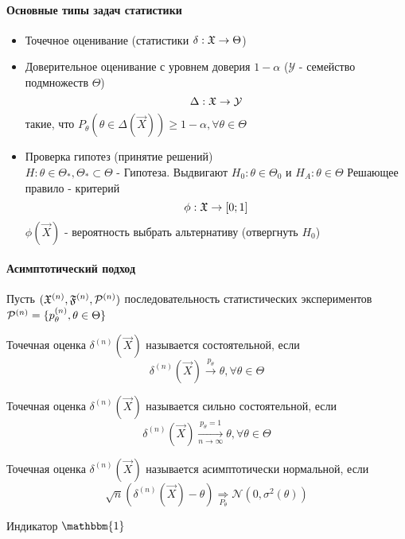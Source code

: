 \documentclass[main.tex]{subfiles}
\begin{document}
\paragraph{Основные типы задач статистики}
\begin{itemize}
	\item Точечное оценивание (статистики $\delta : \mathfrak{X} \rightarrow \Theta$)
	\item Доверительное оценивание с уровнем доверия $1-\alpha$ ($\mathcal{Y}$ - семейство подмножеств $\Theta$)
		$$\Delta : \mathfrak{X} \rightarrow \mathcal{Y}$$
	такие, что $P_\theta (\theta \in \Delta (\vec{X})) \geq 1-\alpha, \forall \theta \in \Theta$
	\item Проверка гипотез (принятие решений) \\
	$H:\theta \in \Theta_*, \Theta_* \subset \Theta$ - Гипотеза. Выдвигают $H_0 : \theta \in \Theta_0$ и $H_A : \theta \in \Theta$ Решающее правило - критерий
	$$\phi : \mathfrak{X} \rightarrow [0;1]$$
	$\phi(\vec{X})$ - вероятность выбрать альтернативу (отвергнуть $H_0$)
\end{itemize}

\paragraph{Асимптотический подход}
Пусть $(\mathfrak{X}^{(n)},\mathfrak{F}^{(n)},\mathcal{P}^{(n)})$ последовательность статистических экспериментов
$\mathcal{P}^{(n)}=\{p_\theta^{(n)},\theta \in \Theta\}$

\begin{definition}
	 Точечная оценка $\delta^{(n)}(\vec{X})$ называется состоятельной, если
	 $$\delta^{(n)}(\vec{X}) \xrightarrow{p_\theta} \theta,\forall \theta \in \Theta $$
\end{definition}

\begin{definition}
	Точечная оценка $\delta^{(n)}(\vec{X})$ называется сильно состоятельной, если
	 $$\delta^{(n)}(\vec{X}) \xrightarrow[n \rightarrow \infty]{p_\theta = 1} \theta,\forall \theta \in \Theta $$
\end{definition}

\begin{definition}
	Точечная оценка $\delta^{(n)}(\vec{X})$ называется асимптотически нормальной, если
	$$\sqrt{n} (\delta^{(n)}(\vec{X}) - \theta) \underset{P_\theta}{\Rightarrow} \mathcal{N}(0,\sigma^2(\theta))$$
\end{definition}
Индикатор $\mathbbm{1}$
\end{document}
